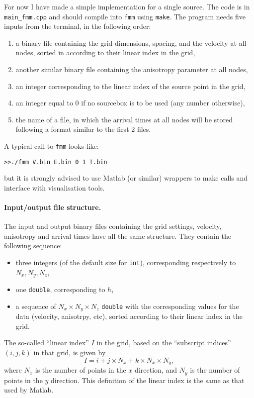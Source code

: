 \documentclass{article}
\begin{document}
For now I have made a simple implementation for a single source. The code is in \verb+main_fmm.cpp+ and should compile into \verb+fmm+ using \verb+make+. The program needs five inputs from the terminal, in the following order:
\begin{enumerate}
\item a binary file containing the grid dimensions, spacing, and the velocity at all nodes, sorted in according to their linear index in the grid,
\item another similar binary file containing the anisotropy parameter at all nodes,
\item an integer corresponding to the linear index of the source point in the grid,
\item an integer equal to 0 if no sourcebox is to be used (any number otherwise),
\item the name of a file, in which the arrival times at all nodes will be stored following a format similar to the first 2 files.
\end{enumerate}
A typical call to \verb+fmm+ looks like:
\begin{verbatim}
>>./fmm V.bin E.bin 0 1 T.bin
\end{verbatim}
but it is strongly advised to use Matlab (or similar) wrappers to make calls and interface with visualisation tools.

\paragraph{Input/output file structure.} The input and output binary files containing the grid settings, velocity, anisotropy and arrival times have all the same structure. They contain the following sequence:
\begin{itemize}
\item three integers (of the default size for \verb+int+), corresponding respectively to $N_x,N_y,N_z$,
\item one \verb+double+, corresponding to $h$,
\item a sequence of $N_x\times N_y\times N_z$ \verb+double+ with the corresponding values for the data (velocity, anisotrpy, etc), sorted according to their linear index in the grid.
\end{itemize}
The so-called ``linear index'' $I$ in the grid, based on the ``subscript indices'' $(i,j,k)$ in that grid, is given by
\begin{equation}
  I = i + j\times N_x + k\times N_x\times N_y,
\end{equation}
where $N_x$ is the number of points in the $x$ direction, and $N_y$ is the number of points in the $y$ direction. This definition of the linear index is the same as that used by Matlab.
\end{document}
